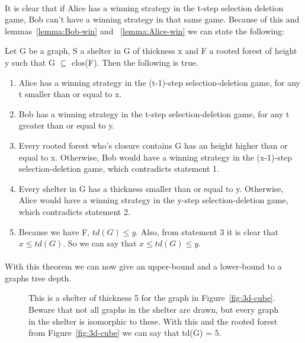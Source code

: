 \paragraph{}
It is clear that if Alice has a winning strategy in the t-step selection deletion game, Bob can't have a winning strategy in that same game. Because of this and lemmas~\ref{lemma:Bob-win} and ~\ref{lemma:Alice-win} we can state the following:
\begin{theorem}
Let G be a graph, S a shelter in G of thickness x and F a rooted forest of height y such that G $\subseteq$ clos(F). Then the following is true.
\begin{enumerate}
\item Alice has a winning strategy in the (t-1)-step selection-deletion game, for any t smaller than or equal to x.
\item Bob has a winning strategy in the t-step selection-deletion game, for any t greater than or equal to y.
\item Every rooted forest who's closure contains G has an height higher than or equal to x. Otherwise, Bob would have a winning strategy in the (x-1)-step selection-deletion game, which contradicts statement 1.
\item Every shelter in G has a thickness smaller than or equal to y. Otherwise, Alice would have a winning strategy in the y-step selection-deletion game, which contradicts statement 2.
\item Because we have F, $td(G) \leq y$. Also, from statement 3 it is clear that $x \leq td(G)$. So we can say that $x \leq td(G) \leq y$.
\end{enumerate}
\end{theorem}

\paragraph{}
With this theorem we can now give an upper-bound and a lower-bound to a graphs tree depth.

\begin{figure}[H]

\caption{This is a shelter of thickness 5 for the graph in Figure~\ref{fig:3d-cube}. Beware that not all graphs in the shelter are drawn, but every graph in the shelter is isomorphic to these. With this and the rooted forest from Figure~\ref{fig:3d-cube} we can say that td(G) = 5. 
\label{fig:3d-cube-shelter}}
\end{figure}